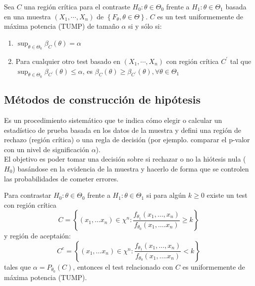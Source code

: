 \begin{definición} 
    Sea $C$ una región crítica para el contraste $H_0: \theta \in \Theta_0$ frente a $H_1: \theta \in \Theta_1$ basada en una muestra $\left(X_{1}, \cdots, X_{n}\right)$ de $\left\{F_{\theta}, \theta \in \Theta\right\}$. $C$ es un test uniformemente de máxima potencia (TUMP) de tamaño $\alpha$ si y sólo si: 
    \begin{enumerate}
        \item $\sup_{\theta \in \Theta_{0}} \beta_{C}(\theta)=\alpha$
        \item Para cualquier otro test basado en $\left(X_{1}, \cdots, X_{n}\right)$ con región crítica $C^{\prime}$ tal que $\sup_{\theta \in \Theta_{0}} \beta_{C^{\prime}}(\theta) \leq \alpha$, es $\beta_{C}(\theta) \geq \beta_{C^{\prime}}(\theta), \forall \theta \in \Theta_{1}$
    \end{enumerate}
\end{definición}


\subsection{Métodos de construcción de hipótesis}

\begin{definición}
    Es un procedimiento sistemático que te indica cómo elegir o calcular un estadístico de prueba basada en los datos de la muestra y defini una región de rechazo (región crítica) o una regla de decisión (por ejemplo. comparar el p-valor con un nivel de significación $\alpha$). \\
    El objetivo es poder tomar una decisión sobre si rechazar o no la hiótesis nula ($H_0$) basándose en la evidencia de la muestra y hacerlo de forma que se controlen las probabilidades de cometer errores.
\end{definición}

\begin{teorema}
    Para contrastar $H_0: \theta \in \Theta_0$ frente a $H_1: \theta \in \Theta_1$ si para algún $k \geq 0$ existe un test con región crítica
    $$C = \left\{ (x_1, \ldots x_n) \in \chi^n : \frac{f_{\theta_1}(x_1, \ldots, x_n)}{f_{\theta_0}(x_1, \ldots. x_n)} \geq k\right\}$$ y región de aceptaión:
    $$C^c = \left\{ (x_1, \ldots x_n) \in \chi^n : \frac{f_{\theta_1}(x_1, \ldots, x_n)}{f_{\theta_0}(x_1, \ldots. x_n)} < k\right\}$$ 
    tales que $\alpha = P_{\theta_0}(C)$, entonces el test relacionado con $C$ es uniformemente de máxima potencia (TUMP).
\end{teorema}

